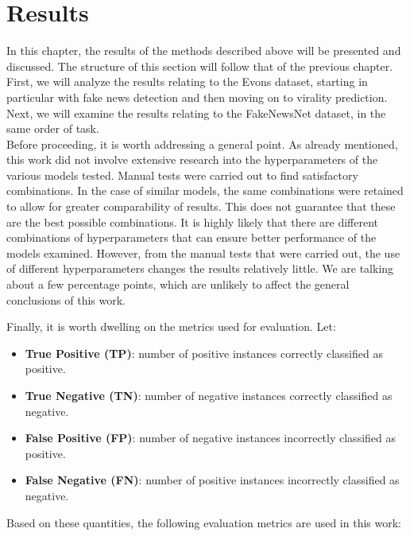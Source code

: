 \documentclass[a4paper,twoside,12pt]{book}
\begin{document}
\chapter{Results}
In this chapter, the results of the methods described above will be presented and discussed. The structure of this section will follow that of the previous chapter. First, we will analyze the results relating to the Evons dataset, starting in particular with fake news detection and then moving on to virality prediction. Next, we will examine the results relating to the FakeNewsNet dataset, in the same order of task.\\

Before proceeding, it is worth addressing a general point. As already mentioned, this work did not involve extensive research into the hyperparameters of the various models tested. Manual tests were carried out to find satisfactory combinations. In the case of similar models, the same combinations were retained to allow for greater comparability of results. This does not guarantee that these are the best possible combinations. It is highly likely that there are different combinations of hyperparameters that can ensure better performance of the models examined. However, from the manual tests that were carried out, the use of different hyperparameters changes the results relatively little. We are talking about a few percentage points, which are unlikely to affect the general conclusions of this work. 

Finally, it is worth dwelling on the metrics used for evaluation. Let:

\begin{itemize}
	\item \textbf{True Positive (TP)}: number of positive instances correctly classified as positive.  
	\item \textbf{True Negative (TN)}: number of negative instances correctly classified as negative.  
	\item \textbf{False Positive (FP)}: number of negative instances incorrectly classified as positive.  
	\item \textbf{False Negative (FN)}: number of positive instances incorrectly classified as negative.  
\end{itemize}

Based on these quantities, the following evaluation metrics are used in this work:  
\end{document}
